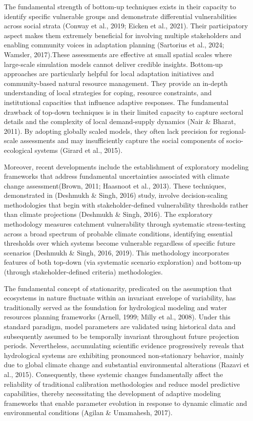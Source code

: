 \documentclass[
]{article}
\begin{document}
The fundamental strength of bottom-up techniques exists in their
capacity to identify specific vulnerable groups and demonstrate
differential vulnerabilities across social strata (Conway et al., 2019;
Eicken et al., 2021). Their participatory aspect makes them extremely
beneficial for involving multiple stakeholders and enabling community
voices in adaptation planning (Sartorius et al., 2024; Wamsler,
2017).These assessments are effective at small spatial scales where
large-scale simulation models cannot deliver credible insights.
Bottom-up approaches are particularly helpful for local adaptation
initiatives and community-based natural resource management. They
provide an in-depth understanding of local strategies for coping,
resource constraints, and institutional capacities that influence
adaptive responses. The fundamental drawback of top-down techniques is
in their limited capacity to capture sectoral details and the complexity
of local demand-supply dynamics (Nair \& Bharat, 2011). By adopting
globally scaled models, they often lack precision for regional-scale
assessments and may insufficiently capture the social components of
socio-ecological systems (Girard et al., 2015).

Moreover, recent developments include the establishment of exploratory
modeling frameworks that address fundamental uncertainties associated
with climate change assessment(Brown, 2011; Haasnoot et al., 2013).
These techniques, demonstrated in (Deshmukh \& Singh, 2016) study,
involve decision-scaling methodologies that begin with
stakeholder-defined vulnerability thresholds rather than climate
projections (Deshmukh \& Singh, 2016). The exploratory methodology
measures catchment vulnerability through systematic stress-testing
across a broad spectrum of probable climate conditions, identifying
essential thresholds over which systems become vulnerable regardless of
specific future scenarios (Deshmukh \& Singh, 2016, 2019). This
methodology incorporates features of both top-down (via systematic
scenario exploration) and bottom-up (through stakeholder-defined
criteria) methodologies.

The fundamental concept of stationarity, predicated on the assumption
that ecosystems in nature fluctuate within an invariant envelope of
variability, has traditionally served as the foundation for hydrological
modeling and water resources planning frameworks (Arnell, 1999; Milly et
al., 2008). Under this standard paradigm, model parameters are validated
using historical data and subsequently assumed to be temporally
invariant throughout future projection periods. Nevertheless,
accumulating scientific evidence progressively reveals that hydrological
systems are exhibiting pronounced non-stationary behavior, mainly due to
global climate change and substantial environmental alterations (Razavi
et al., 2015). Consequently, these systemic changes fundamentally affect
the reliability of traditional calibration methodologies and reduce
model predictive capabilities, thereby necessitating the development of
adaptive modeling frameworks that enable parameter evolution in response
to dynamic climatic and environmental conditions (Agilan \& Umamahesh,
2017).
\end{document}
